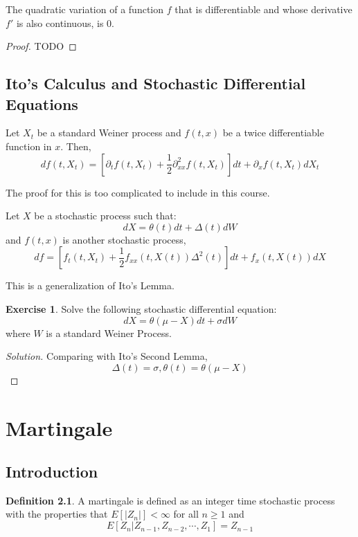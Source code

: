\documentclass[12pt,letterpaper]{book}
\theoremstyle{definition}
\newtheorem{definition}{Definition}%
\newtheorem*{exercise}{Exercise}
\newenvironment{solution}
  {\renewcommand\qedsymbol{$\blacksquare$}\begin{proof}[Solution]}
  {\end{proof}}
\begin{document}
\begin{theorem}
  The quadratic variation of a function $f$ that is differentiable and whose derivative $f'$ is also continuous, is 0. 
\end{theorem}
\begin{proof}
  TODO
\end{proof}

\section{Ito's Calculus and Stochastic Differential Equations}

\begin{lemma}
Let $X_t$ be a standard Weiner process and $f(t,x)$ be a twice differentiable function in $x$. Then,
\[df(t,X_t) = \left[ \partial_t f(t,X_t) + \frac{1}{2} \partial^2_{xx} f(t,X_t) \right ]  dt + \partial_x f(t,X_t) dX_t \]
\end{lemma}

The proof for this is too complicated to include in this course.

\begin{lemma}
  Let $X$ be a stochastic process such that:
  \[dX = \theta(t) dt + \Delta(t) dW\]
  and $f(t,x)$ is another stochastic process,
  \[df = \left[ f_t(t,X_t) + \frac{1}{2} f_{xx}(t,X(t)) \Delta^2(t) \right] dt + f_{x}(t,X(t)) dX \]
\end{lemma}

This is a generalization of Ito's Lemma.

\begin{exercise}
  Solve the following stochastic differential equation:
  \[dX = \theta (\mu - X) dt + \sigma dW\]
  where $W$ is a standard Weiner Process.
\end{exercise}
\begin{solution}
  Comparing with Ito's Second Lemma,
  \[\Delta(t) = \sigma, \theta(t) = \theta (\mu - X)\]
\end{solution}

\chapter{Martingale} 

\section{Introduction}

\begin{definition}
  A martingale is defined as an integer time stochastic process with the properties that $E[|Z_n|] < \infty$ for all $n \geq 1$ and
  \[E[Z_n | Z_{n-1}, Z_{n-2}, \cdots , Z_1] = Z_{n-1}\]
\end{definition}
\end{document}
